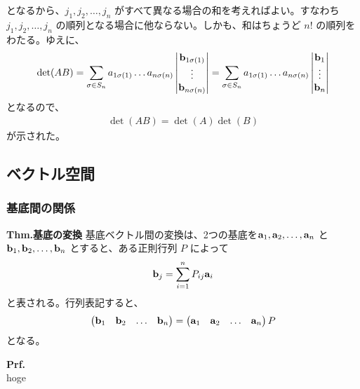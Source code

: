 \documentclass[a4paper,11pt]{jsarticle}
\numberwithin{equation}{section}
\begin{document}
となるから、$j_1, j_2, \dots, j_n$ がすべて異なる場合の和を考えればよい。すなわち $j_1, j_2, \dots, j_n$ の順列となる場合に他ならない。しかも、和はちょうど $n!$ の順列をわたる。ゆえに、
\begin{align}
  \det(AB) = \sum_{\sigma \in S_n} a_{1\sigma(1)} \dots a_{n\sigma(n)} 
  \begin{vmatrix}
      \vb{b}_{1\sigma(1)} \\
      \vdots \\
      \vb{b}_{n\sigma(n)}
  \end{vmatrix}
  = \sum_{\sigma \in S_n} a_{1\sigma(1)} \dots a_{n\sigma(n)} 
  \begin{vmatrix}
      \vb{b}_{1} \\
      \vdots \\
      \vb{b}_{n}
  \end{vmatrix}
\end{align}
となるので、
\begin{align}
  \det(AB) = \det(A) \det(B)
\end{align}
が示された。\hfill\qedsymbol\\

\subsection{ベクトル空間}
\subsubsection{基底間の関係}
\begin{itembox}[l]{\textbf{Thm.基底の変換}}
  基底ベクトル間の変換は、2つの基底を$\vb{a}_1, \vb{a}_2, \dots, \vb{a}_n$ と $\vb{b}_1, \vb{b}_2, \dots, \vb{b}_n$ とすると、ある正則行列 $P$ によって 
  \begin{align}
    \vb{b}_j = \sum_{i=1}^{n} P_{ij} \vb{a}_i
  \end{align}
  と表される。行列表記すると、
  \begin{align}
    \begin{pmatrix}
      \vb{b}_1 & \vb{b}_2 & \dots & \vb{b}_n
    \end{pmatrix}
    =
    \begin{pmatrix}
      \vb{a}_1 & \vb{a}_2 & \dots & \vb{a}_n
    \end{pmatrix}
    P
  \end{align}
  となる。
\end{itembox}
\textbf{Prf.}\\
hoge\hfill\qedsymbol\\
\end{document}
